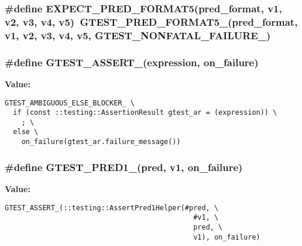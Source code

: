 \subsubsection{\setlength{\rightskip}{0pt plus 5cm}\#define EXPECT\_\-PRED\_\-FORMAT5(pred\_\-format, v1, v2, v3, v4, v5)~GTEST\_\-PRED\_\-FORMAT5\_\-(pred\_\-format, v1, v2, v3, v4, v5, GTEST\_\-NONFATAL\_\-FAILURE\_\-)}\label{gtest__pred__impl_8h_92351507fd71e6cf2b8144edfc32cdac}


\subsubsection{\setlength{\rightskip}{0pt plus 5cm}\#define GTEST\_\-ASSERT\_\-(expression, on\_\-failure)}\label{gtest__pred__impl_8h_8216a4b47b71c55f51c6889b13115c3d}


\textbf{Value:}

\begin{Code}\begin{verbatim}GTEST_AMBIGUOUS_ELSE_BLOCKER_ \
  if (const ::testing::AssertionResult gtest_ar = (expression)) \
    ; \
  else \
    on_failure(gtest_ar.failure_message())
\end{verbatim}
\end{Code}
\subsubsection{\setlength{\rightskip}{0pt plus 5cm}\#define GTEST\_\-PRED1\_\-(pred, v1, on\_\-failure)}\label{gtest__pred__impl_8h_7aeea2577a6bd0ad1b25fbe678fd8780}


\textbf{Value:}

\begin{Code}\begin{verbatim}GTEST_ASSERT_(::testing::AssertPred1Helper(#pred, \
                                             #v1, \
                                             pred, \
                                             v1), on_failure)
\end{verbatim}
\end{Code}
